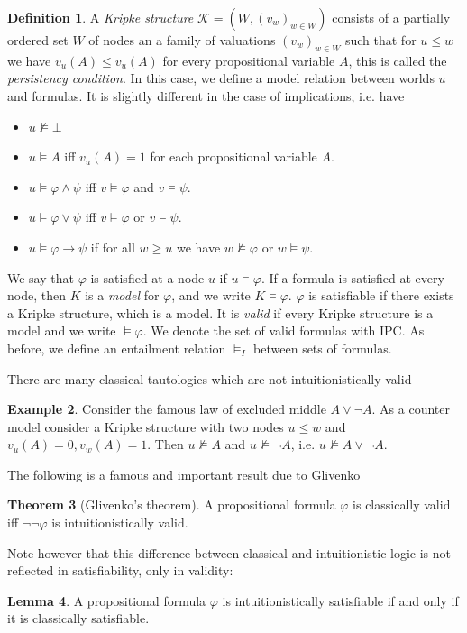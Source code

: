 \documentclass[a4paper,11pt]{report}
\theoremstyle{definition}
\newtheorem{theorem}{Theorem}[section]
\theoremstyle{definition}
\theoremstyle{definition}
\newtheorem{lemma}[theorem]{Lemma}
\theoremstyle{definition}
\theoremstyle{definition}
\newtheorem{definition}[theorem]{Definition}
\theoremstyle{definition}
\newtheorem{example}[theorem]{Example}
\theoremstyle{definition}
\begin{document}
	\begin{definition}
		A \textit{Kripke structure} $\mathcal K = (W, (v_w)_{w\in W})$ consists of a partially ordered set $W$ of nodes an a family of valuations $(v_w)_{w\in W}$ such that for $u\leq w$ we have $v_u(A)\leq v_u(A)$ for every propositional variable $A$, this is called the \textit{persistency condition}. In this case, we define a model relation between worlds $u$ and formulas. It is slightly different in the case of implications, i.e. have
		\begin{itemize}
			\item $u\not\models \bot$
			\item $u\models A$ iff $v_u(A) = 1$ for each propositional variable $A$.
			\item $u\models \varphi\wedge\psi$ iff $v\models\varphi$ and $v\models\psi$.
			\item $u\models\varphi\vee\psi$ iff $v\models\varphi$ or $v\models\psi$.
			\item $u\models\varphi\to \psi$ if for all $w\geq u$ we have $w\not\models\varphi$ or $w\models\psi$.
		\end{itemize}
		We say that $\varphi$ is satisfied at a node $u$ if $u\models\varphi$. If a formula is satisfied at every node, then $K$ is a \textit{model} for $\varphi$, and we write $K\models \varphi$. $\varphi$ is satisfiable if there exists a Kripke structure, which is a model. It is \textit{valid} if every Kripke structure is a model and we write $\models \varphi$. We denote the set of valid formulas with IPC. As before, we define an entailment relation $\models_I$ between sets of formulas.
	\end{definition}
	There are many classical tautologies which are not intuitionistically valid
	\begin{example}\label{LEMcounterexample}
		Consider the famous law of excluded middle $A\vee\neg A$. As a counter model consider a Kripke structure with two nodes $u\leq w$ and $v_u(A) = 0, v_w(A) = 1$. Then $u\not\models A$ and $u\not\models \neg A$, i.e. $u\not\models A\vee\neg A$. 
	\end{example}
	The following is a famous and important result due to Glivenko~\cite{glivenko1929}
	
	\begin{theorem}[Glivenko's theorem]
		A propositional formula $\varphi$ is classically valid iff $\neg\neg\varphi$ is intuitionistically valid.
	\end{theorem}
	\noindent Note however that this difference between classical and intuitionistic logic is not reflected in satisfiability, only in validity:
	\begin{lemma}\label{propsat}
		A propositional formula $\varphi$ is intuitionistically satisfiable if and only if it is classically satisfiable.
	\end{lemma}
\end{document}
